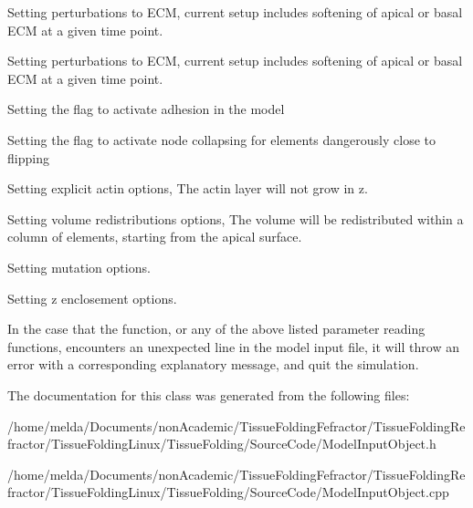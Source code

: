 Setting perturbations to E\+C\+M, current setup includes softening of apical or basal E\+C\+M at a given time point.

Setting perturbations to E\+C\+M, current setup includes softening of apical or basal E\+C\+M at a given time point.

Setting the flag to activate adhesion in the model

Setting the flag to activate node collapsing for elements dangerously close to flipping

Setting explicit actin options, The actin layer will not grow in z.

Setting volume redistributions options, The volume will be redistributed within a column of elements, starting from the apical surface.

Setting mutation options.

Setting z enclosement options.

In the case that the function, or any of the above listed parameter reading functions, encounters an unexpected line in the model input file, it will throw an error with a corresponding explanatory message, and quit the simulation.

The documentation for this class was generated from the following files\+:\begin{DoxyCompactItemize}
\item 
/home/melda/\+Documents/non\+Academic/\+Tissue\+Folding\+Fefractor/\+Tissue\+Folding\+Refractor/\+Tissue\+Folding\+Linux/\+Tissue\+Folding/\+Source\+Code/Model\+Input\+Object.\+h\item 
/home/melda/\+Documents/non\+Academic/\+Tissue\+Folding\+Fefractor/\+Tissue\+Folding\+Refractor/\+Tissue\+Folding\+Linux/\+Tissue\+Folding/\+Source\+Code/Model\+Input\+Object.\+cpp\end{DoxyCompactItemize}
